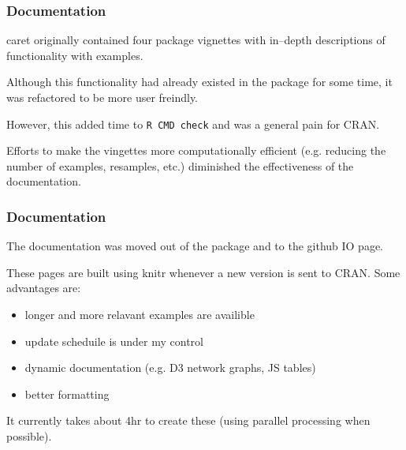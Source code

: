 \documentclass[12 pt]{beamer}\usepackage[]{graphicx}\usepackage[]{color}
\newcommand{\pkg}[1]{{\fontseries{b}\selectfont #1}}
\renewcommand{\pkg}[1]{{\color{darkgreen}\textsf{#1}}}
\begin{document}
  \begin{frame}[fragile]
\frametitle{Documentation}

\pkg{caret} originally contained four package vignettes with in--depth descriptions of functionality with examples. 

\vspace{.15in}

Although this functionality had already existed in the package for some time, it was refactored to be more user freindly. 

\vspace{.15in}

However, this added time to \texttt{R CMD check} and was a general pain for CRAN.

\vspace{.15in}

Efforts to make the vingettes more computationally efficient (e.g. reducing the number of examples, resamples, etc.) diminished the effectiveness of the documentation.  


\end{frame}

  
  \begin{frame}[fragile]
\frametitle{Documentation}

The documentation was moved out of the package and to the github IO page. 

\vspace{.15in}


These pages are built using \pkg{knitr} whenever a new version is sent to CRAN. Some advantages are:

\begin{itemize}
\item longer and more relavant examples are availible
\item update scheduile is under my control
\item dynamic documentation (e.g. D3 network graphs, JS tables)
\item better formatting
\end{itemize}

\vspace{.1in}

It currently takes about 4hr to create these (using parallel processing when possible). 

\end{frame}
\end{document}
